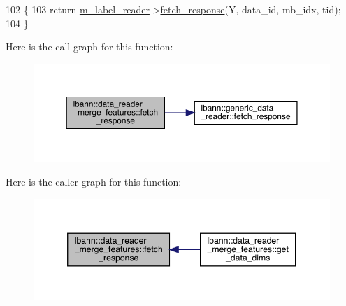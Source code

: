 \begin{DoxyCode}
102                                                          \{
103   \textcolor{keywordflow}{return} \hyperlink{classlbann_1_1data__reader__merge__features_a1e54a136c63b934f44ff91dc68ea3b27}{m\_label\_reader}->\hyperlink{classlbann_1_1generic__data__reader_abe544ea807eed477f3636010d199b574}{fetch\_response}(Y, data\_id, mb\_idx, tid);
104 \}
\end{DoxyCode}
Here is the call graph for this function\+:\nopagebreak
\begin{figure}[H]
\begin{center}
\leavevmode
\includegraphics[width=350pt]{classlbann_1_1data__reader__merge__features_afd9fa7d10c466eca62ac7af3cbc3ddcb_cgraph}
\end{center}
\end{figure}
Here is the caller graph for this function\+:\nopagebreak
\begin{figure}[H]
\begin{center}
\leavevmode
\includegraphics[width=346pt]{classlbann_1_1data__reader__merge__features_afd9fa7d10c466eca62ac7af3cbc3ddcb_icgraph}
\end{center}
\end{figure}
\mbox{\label{classlbann_1_1data__reader__merge__features_aa0cd0caf93ad18f496bf80d7cafa5527}} 
